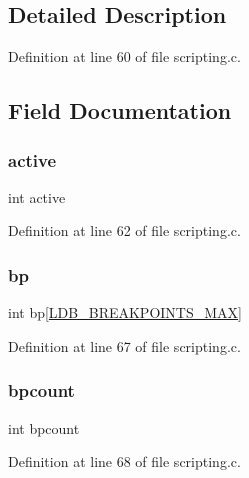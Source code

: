 \subsection{Detailed Description}


Definition at line 60 of file scripting.\+c.



\subsection{Field Documentation}
\mbox{\label{structldb_state_aa5805c5e936174e5092bf7a5b78e7e64}} 
\subsubsection{\texorpdfstring{active}{active}}
{\footnotesize\ttfamily int active}



Definition at line 62 of file scripting.\+c.

\mbox{\label{structldb_state_ac9df7cc923c5d2a35bfc27dd8530b9af}} 
\subsubsection{\texorpdfstring{bp}{bp}}
{\footnotesize\ttfamily int bp\mbox{[}\hyperlink{scripting_8c_a4f3000cf3b5955f8134bfcd2fa340db3}{L\+D\+B\+\_\+\+B\+R\+E\+A\+K\+P\+O\+I\+N\+T\+S\+\_\+\+M\+AX}\mbox{]}}



Definition at line 67 of file scripting.\+c.

\mbox{\label{structldb_state_a472140f37a2e6de6a1a4cd2fce742d78}} 
\subsubsection{\texorpdfstring{bpcount}{bpcount}}
{\footnotesize\ttfamily int bpcount}



Definition at line 68 of file scripting.\+c.

\mbox{\label{structldb_state_a3d56df85c9742c537178642bc4ee7355}} 
